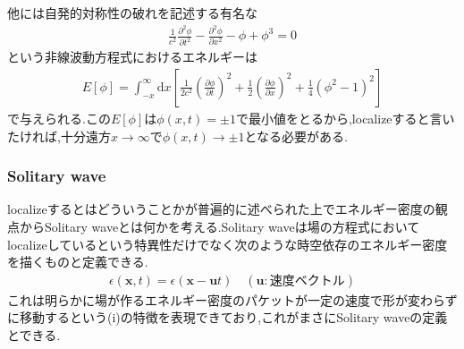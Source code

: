 \documentclass[dvipdfmx,11pt,a4paper,oneside,openany]{jsbook}
\begin{document}
他には自発的対称性の破れを記述する有名な
\begin{align}
    \frac{1}{c^{2}} \frac{\partial^{2} \phi}{\partial t^{2}}-\frac{\partial^{2} \phi}{\partial x^{2}}-\phi+\phi^{3}=0
\end{align}
という非線波動方程式におけるエネルギーは
\begin{align}
    E[\phi]=\int_{-x}^{\infty} \mathrm{d} x\left[\frac{1}{2 c^{2}}\left(\frac{\partial \phi}{\partial t}\right)^{2}+\frac{1}{2}\left(\frac{\partial \phi}{\partial x}\right)^{2}+\frac{1}{4}\left(\phi^{2}-1\right)^{2}\right]
\end{align}
で与えられる.この$E[\phi]$は$\phi(x,t)=\pm 1$で最小値をとるから,localizeすると言いたければ,十分遠方$x\rightarrow \infty$で$\phi(x,t)\rightarrow \pm 1$となる必要がある.

\subsubsection{Solitary wave}
localizeするとはどういうことかが普遍的に述べられた上でエネルギー密度の観点からSolitary waveとは何かを考える.Solitary waveは場の方程式においてlocalizeしているという特異性だけでなく次のような時空依存のエネルギー密度を描くものと定義できる.
\begin{align}
    \epsilon(\bm{x},t)=\epsilon(\bm{x}-\bm{u}t)\quad (\bm{u}: \text{速度ベクトル})\label{eq:2.8}
\end{align}
これは明らかに場が作るエネルギー密度のパケットが一定の速度で形が変わらずに移動するという(i)の特徴を表現できており,これがまさにSolitary  waveの定義とできる.
\end{document}
